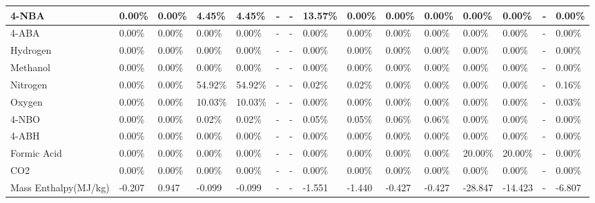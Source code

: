 \begin{landscape}
\begin{table}[H]
\begin{tabular}{|l|l|l|l|l|l|l|l|l|l|l|l|l|l|l|}
4-NBA                   & 0.00\%   & 0.00\%   & 4.45\%  & 4.45\%  & -    & -    & 13.57\% & 0.00\%  & 0.00\%  & 0.00\%  & 0.00\%  & 0.00\%  & -    & 0.00\%  \\ \hline
4-ABA                   & 0.00\%   & 0.00\%   & 0.00\%  & 0.00\%  & -    & -    & 0.00\%  & 0.00\%  & 0.00\%  & 0.00\%  & 0.00\%  & 0.00\%  & -    & 0.00\%  \\ \hline
Hydrogen                & 0.00\%   & 0.00\%   & 0.00\%  & 0.00\%  & -    & -    & 0.00\%  & 0.00\%  & 0.00\%  & 0.00\%  & 0.00\%  & 0.00\%  & -    & 0.00\%  \\ \hline
Methanol                & 0.00\%   & 0.00\%   & 0.00\%  & 0.00\%  & -    & -    & 0.00\%  & 0.00\%  & 0.00\%  & 0.00\%  & 0.00\%  & 0.00\%  & -    & 0.00\%  \\ \hline
Nitrogen                & 0.00\%   & 0.00\%   & 54.92\% & 54.92\% & -    & -    & 0.02\%  & 0.02\%  & 0.00\%  & 0.00\%  & 0.00\%  & 0.00\%  & -    & 0.16\%  \\ \hline
Oxygen                  & 0.00\%   & 0.00\%   & 10.03\% & 10.03\% & -    & -    & 0.00\%  & 0.00\%  & 0.00\%  & 0.00\%  & 0.00\%  & 0.00\%  & -    & 0.03\%  \\ \hline
4-NBO                   & 0.00\%   & 0.00\%   & 0.02\%  & 0.02\%  & -    & -    & 0.05\%  & 0.05\%  & 0.06\%  & 0.06\%  & 0.00\%  & 0.00\%  & -    & 0.00\%  \\ \hline
4-ABH                   & 0.00\%   & 0.00\%   & 0.00\%  & 0.00\%  & -    & -    & 0.00\%  & 0.00\%  & 0.00\%  & 0.00\%  & 0.00\%  & 0.00\%  & -    & 0.00\%  \\ \hline
Formic Acid             & 0.00\%   & 0.00\%   & 0.00\%  & 0.00\%  & -    & -    & 0.00\%  & 0.00\%  & 0.00\%  & 0.00\%  & 20.00\% & 20.00\% & -    & 0.00\%  \\ \hline
CO2                     & 0.00\%   & 0.00\%   & 0.00\%  & 0.00\%  & -    & -    & 0.00\%  & 0.00\%  & 0.00\%  & 0.00\%  & 0.00\%  & 0.00\%  & -    & 0.00\%  \\ \hline
Mass Enthalpy(MJ/kg)    & -0.207   & 0.947    & -0.099  & -0.099  & -    & -    & -1.551  & -1.440  & -0.427  & -0.427  & -28.847 & -14.423 & -    & -6.807  \\ \hline
\end{tabular}
\end{table}




\end{landscape}
